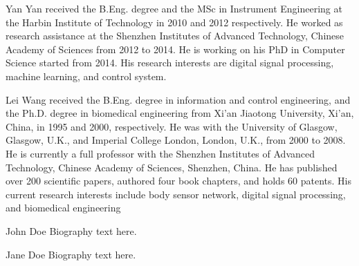 \documentclass[journal]{IEEEtran}
\begin{document}
\begin{IEEEbiography}{Yan Yan}
received the B.Eng. degree and the MSc in Instrument Engineering at the Harbin Institute of Technology in 2010 and 2012 respectively. 
He worked as research assistance at the Shenzhen Institutes of Advanced Technology, Chinese Academy of Sciences from 2012 to 2014. 
He is working on his PhD in Computer Science started from 2014.
His research interests are digital signal processing, machine learning, and control system.
\end{IEEEbiography}


\begin{IEEEbiography}{Lei Wang}
received the B.Eng. degree in information and control engineering, and the Ph.D. degree in biomedical engineering from Xi’an Jiaotong University, Xi’an, China, in 1995 and 2000, respectively. He was with the University of Glasgow, Glasgow, U.K., and Imperial College London, London, U.K., from 2000 to 2008. He is currently a full professor with the Shenzhen Institutes of Advanced Technology, Chinese Academy of Sciences, Shenzhen, China. He has published over 200 scientific papers, authored four book chapters, and holds 60 patents. His current research interests include body sensor network, digital signal processing, and biomedical engineering
\end{IEEEbiography}

\begin{IEEEbiographynophoto}{John Doe}
Biography text here.
\end{IEEEbiographynophoto}


\begin{IEEEbiographynophoto}{Jane Doe}
Biography text here.
\end{IEEEbiographynophoto}






\end{document}
